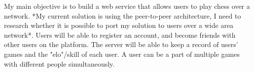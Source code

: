 My main objective is to build a web service that allows users to play chess over a network. *My current solution is using the peer-to-peer architecture, I need to research whether it is possible to port my solution to users over a wide area network*.
\linebreak
Users will be able to register an account, and become friends with other users on the platform.
\linebreak
The server will be able to keep a record of users' games and the "elo"/skill of each user.
\linebreak
A user can be a part of multiple games with different people simultaneously.